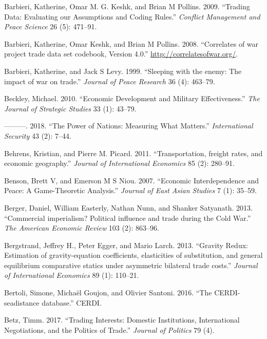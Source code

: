 \documentclass{puthesis}
\newlength{\cslhangindent}
\newenvironment{cslreferences}%
  {\setlength{\parindent}{0pt}%
  \everypar{\setlength{\hangindent}{\cslhangindent}}\ignorespaces}%
  {\par}
\begin{document}
\begin{cslreferences}
\leavevmode\hypertarget{ref-Barbieri2009}{}%
Barbieri, Katherine, Omar M. G. Keshk, and Brian M Pollins. 2009.
``Trading Data: Evaluating our Assumptions and Coding Rules.''
\emph{Conflict Management and Peace Science} 26 (5): 471--91.

\leavevmode\hypertarget{ref-Barbieri2008}{}%
Barbieri, Katherine, Omar Keshk, and Brian M Pollins. 2008. ``Correlates
of war project trade data set codebook, Version 4.0.''
\url{http://correlatesofwar.org/}.

\leavevmode\hypertarget{ref-Barbieri1999}{}%
Barbieri, Katherine, and Jack S Levy. 1999. ``Sleeping with the enemy:
The impact of war on trade.'' \emph{Journal of Peace Research} 36 (4):
463--79.

\leavevmode\hypertarget{ref-Beckley2010}{}%
Beckley, Michael. 2010. ``Economic Development and Military
Effectiveness.'' \emph{The Journal of Strategic Studies} 33 (1): 43--79.

\leavevmode\hypertarget{ref-Beckley2018}{}%
---------. 2018. ``The Power of Nations: Measuring What Matters.''
\emph{International Security} 43 (2): 7--44.

\leavevmode\hypertarget{ref-Behrens2011}{}%
Behrens, Kristian, and Pierre M. Picard. 2011. ``Transportation, freight
rates, and economic geography.'' \emph{Journal of International
Economics} 85 (2): 280--91.

\leavevmode\hypertarget{ref-Benson2007}{}%
Benson, Brett V, and Emerson M S Niou. 2007. ``Economic Interdependence
and Peace: A Game-Theoretic Analysis.'' \emph{Journal of East Asian
Studies} 7 (1): 35--59.

\leavevmode\hypertarget{ref-Berger2013}{}%
Berger, Daniel, William Easterly, Nathan Nunn, and Shanker Satyanath.
2013. ``Commercial imperialism? Political influence and trade during the
Cold War.'' \emph{The American Economic Review} 103 (2): 863--96.

\leavevmode\hypertarget{ref-Bergstrand2013}{}%
Bergstrand, Jeffrey H., Peter Egger, and Mario Larch. 2013. ``Gravity
Redux: Estimation of gravity-equation coefficients, elasticities of
substitution, and general equilibrium comparative statics under
asymmetric bilateral trade costs.'' \emph{Journal of International
Economics} 89 (1): 110--21.

\leavevmode\hypertarget{ref-Bertoli2016}{}%
Bertoli, Simone, Michaël Goujon, and Olivier Santoni. 2016. ``The
CERDI-seadistance database.'' CERDI.

\leavevmode\hypertarget{ref-Betz2017}{}%
Betz, Timm. 2017. ``Trading Interests: Domestic Institutions,
International Negotiations, and the Politics of Trade.'' \emph{Journal
of Politics} 79 (4).


\end{cslreferences}
\end{document}
